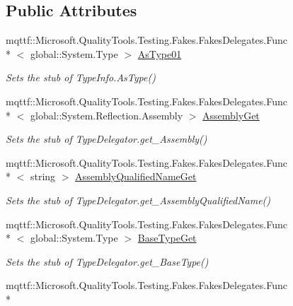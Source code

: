 \subsection*{Public Attributes}
\begin{DoxyCompactItemize}
\item 
mqttf\-::\-Microsoft.\-Quality\-Tools.\-Testing.\-Fakes.\-Fakes\-Delegates.\-Func\\*
$<$ global\-::\-System.\-Type $>$ \hyperlink{class_system_1_1_reflection_1_1_fakes_1_1_stub_type_delegator_a22310d78e6da5878cb933d49fde3e931}{As\-Type01}
\begin{DoxyCompactList}\small\item\em Sets the stub of Type\-Info.\-As\-Type()\end{DoxyCompactList}\item 
mqttf\-::\-Microsoft.\-Quality\-Tools.\-Testing.\-Fakes.\-Fakes\-Delegates.\-Func\\*
$<$ global\-::\-System.\-Reflection.\-Assembly $>$ \hyperlink{class_system_1_1_reflection_1_1_fakes_1_1_stub_type_delegator_a95dacc4044d60aa75ce0d71ee4f89c27}{Assembly\-Get}
\begin{DoxyCompactList}\small\item\em Sets the stub of Type\-Delegator.\-get\-\_\-\-Assembly()\end{DoxyCompactList}\item 
mqttf\-::\-Microsoft.\-Quality\-Tools.\-Testing.\-Fakes.\-Fakes\-Delegates.\-Func\\*
$<$ string $>$ \hyperlink{class_system_1_1_reflection_1_1_fakes_1_1_stub_type_delegator_a543d40dc10ef7aa918544103928673f1}{Assembly\-Qualified\-Name\-Get}
\begin{DoxyCompactList}\small\item\em Sets the stub of Type\-Delegator.\-get\-\_\-\-Assembly\-Qualified\-Name()\end{DoxyCompactList}\item 
mqttf\-::\-Microsoft.\-Quality\-Tools.\-Testing.\-Fakes.\-Fakes\-Delegates.\-Func\\*
$<$ global\-::\-System.\-Type $>$ \hyperlink{class_system_1_1_reflection_1_1_fakes_1_1_stub_type_delegator_aee2eccbc78774fc5319d9e2f9d0a68b4}{Base\-Type\-Get}
\begin{DoxyCompactList}\small\item\em Sets the stub of Type\-Delegator.\-get\-\_\-\-Base\-Type()\end{DoxyCompactList}\item 
mqttf\-::\-Microsoft.\-Quality\-Tools.\-Testing.\-Fakes.\-Fakes\-Delegates.\-Func\\*

\end{DoxyCompactItemize}
